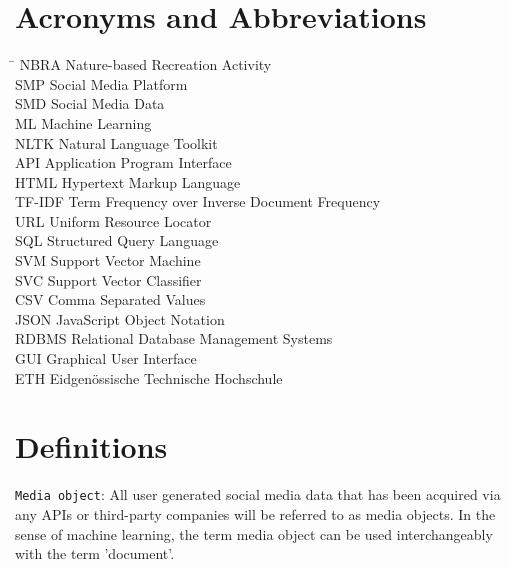 
\section*{Acronyms and Abbreviations}
\begin{tabbing}
 \hspace*{1.6cm}  \= \kill
 NBRA \> Nature-based Recreation Activity \\[0.5ex]
 SMP \> Social Media Platform \\
 SMD \> Social Media Data \\
 ML \> Machine Learning \\
 NLTK \> Natural Language Toolkit \\
 API \> Application Program Interface \\
 HTML \> Hypertext Markup Language \\
 TF-IDF \> Term Frequency over Inverse Document Frequency \\
 URL \> Uniform Resource Locator \\
 SQL \> Structured Query Language \\
 SVM \> Support Vector Machine \\
 SVC \> Support Vector Classifier \\
 CSV \> Comma Separated Values \\
 JSON \> JavaScript Object Notation \\
 RDBMS \> Relational Database Management Systems \\
 GUI \> Graphical User Interface \\
 ETH \> Eidgen\"{o}ssische Technische Hochschule
\end{tabbing}

\section*{Definitions} \label{definitions}
\texttt{Media object}: All user generated social media data that has been acquired via any APIs or third-party companies will be referred to as media objects. In the sense of machine learning, the term media object can be used interchangeably with the term 'document'.\newline

